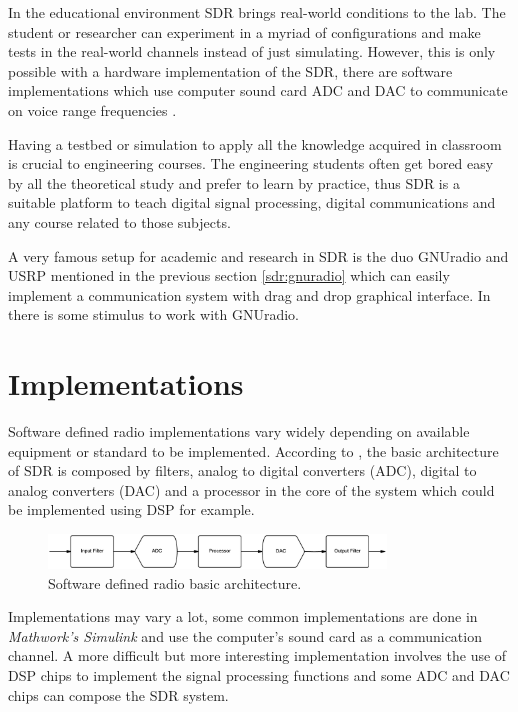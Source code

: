 In the educational environment SDR brings real-world conditions to the lab. The
student or researcher can experiment in a myriad of configurations and make
tests in the real-world channels instead of just simulating. However, this is
only possible with a hardware implementation of the SDR, there are software
implementations which use computer sound card ADC and DAC to communicate on
voice range frequencies \cite{ladimer2009}.

Having a testbed or simulation to apply all the knowledge acquired in classroom
is crucial to engineering courses. The engineering students often get bored easy
by all the theoretical study and prefer to learn by practice, thus SDR is a
suitable platform to teach digital signal processing, digital communications and
any course related to those subjects.

A very famous setup for academic and research in SDR is the duo GNUradio
\cite{web:gnuradio} and USRP \cite{web:usrp} mentioned in the previous section
\ref{sdr:gnuradio} which can easily implement a communication system with drag
and drop graphical interface. In \cite{akbook} there is some stimulus to work
with GNUradio.


\section{Implementations}
\label{sdr:implement}

Software defined radio implementations vary widely depending on available
equipment or standard to be implemented. According to \cite{ladimer2009}, the basic
architecture of SDR is composed by filters, analog to digital converters (ADC),
digital to analog converters (DAC) and a processor in the core of the system
which could be implemented using DSP for example.

\begin{figure}[htbp]
    \centering
    \includegraphics[width=0.8\textwidth]{./figures/sdr_basic_arch}
    \caption{ Software defined radio basic architecture.
    \label{fig:sdr_basic}}
\end{figure}


Implementations may vary a lot, some common implementations are done in
\textit{Mathwork's Simulink} and use the computer’s sound card as a
communication channel. A more difficult but more interesting implementation
involves the use of DSP chips to implement the signal processing functions and
some ADC and DAC chips can compose the SDR system.

